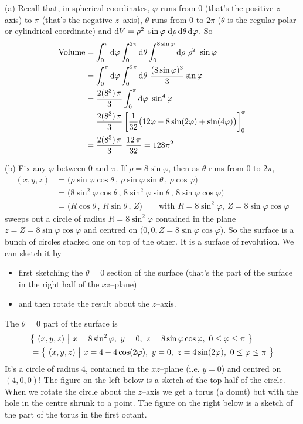 \begin{solution}
(a)
Recall that, in spherical coordinates, $\varphi$ runs from $0$ (that's the
positive $z$--axis) to $\pi$ (that's the negative $z$--axis),
$\theta$ runs from $0$ to $2\pi$ ($\theta$ is the regular polar 
or cylindrical coordinate)
and 
 $\dee{V} = \rho^2\ \sin\varphi\ \dee{\rho}\,\dee{\theta}\,\dee{\varphi}$.
So
\begin{align*}
\text{Volume} & = \int_0^\pi \dee{\varphi}\int_0^{2\pi}\dee{\theta}
                      \int_0^{8\sin\varphi}\dee{\rho}\ \rho^2\ \sin\varphi \\
& = \int_0^\pi \dee{\varphi}\int_0^{2\pi}\dee{\theta}\ 
                      \frac{(8\sin\varphi)^3}{3} \sin\varphi \\
& = \frac{2(8^3)\,\pi}{3} \int_0^\pi \dee{\varphi}\ 
                       \sin^4\varphi \\
&= \frac{2(8^3)\,\pi}{3} \left[\frac{1}{32}\big(12\varphi -8\sin(2\varphi)
+\sin(4\varphi)\big)\right]_0^\pi \\
&=\frac{2(8^3)\,\pi}{3}\ \frac{12\,\pi}{32}
=128\pi^2
\end{align*}

(b) Fix any $\varphi$ between $0$ and $\pi$. If $\rho=8\sin\varphi$,
then as $\theta$ runs from $0$ to $2\pi$,
\begin{align*}
(x,y,z) &= \big(\rho\sin\varphi\cos\theta\,,\,\rho\sin\varphi\sin\theta\,,\,
               \rho\cos\varphi\big) \\
        &= \big(8\sin^2\varphi\cos\theta\,,\,8\sin^2\varphi\sin\theta\,,\,
               8\sin\varphi\cos\varphi\big) \\
        &= \big(R\cos\theta\,,\,R\sin\theta\,,\,Z\big)\qquad
        \text{with }R=8\sin^2\varphi,\ Z= 8\sin\varphi\cos\varphi
\end{align*}
sweeps out a circle of radius $R=8\sin^2\varphi$ contained in the plane 
$z=Z=8\sin\varphi\cos\varphi$ and centred on
$\big(0,0,Z=8\sin\varphi\cos\varphi\big)$. So the surface is
a bunch of circles stacked one on top of the other. It is a surface of
revolution. We can sketch it by 
\begin{itemize}
\item 
first sketching the $\theta=0$ section of the surface (that's the part of
the surface in the right half of the $xz$--plane)
\item
and then rotate the result about the $z$--axis.
\end{itemize}
The $\theta=0$ part of the surface is
\begin{align*}
&\Set{(x,y,z)}{x=8\sin^2\varphi,\ y=0,\ z=8\sin\varphi\cos\varphi,\ 
                     0\le\varphi\le \pi} \\
&=\Set{(x,y,z)}{x=4-4\cos(2\varphi),\ y=0,\ z=4\sin(2\varphi),\ 
                     0\le\varphi\le \pi}
\end{align*}
It's a circle of radius $4$, contained in the $xz$--plane (i.e. $y=0$)
and centred on $(4,0,0)$! The figure on the left below is a sketch of the
top half of the circle. When we rotate the circle about the $z$--axis
we get a torus (a donut) but with the hole in the centre shrunk to a point.
The figure on the right below is a sketch of the part of the torus in the
first octant.


\end{solution}
